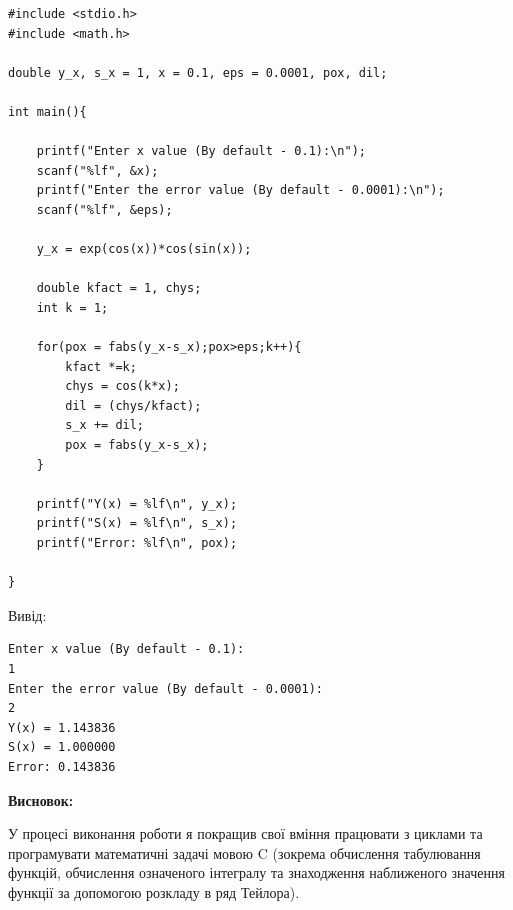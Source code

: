 \documentclass{article}
\begin{document}
\begin{lstlisting}[frame=single]
#include <stdio.h>
#include <math.h>

double y_x, s_x = 1, x = 0.1, eps = 0.0001, pox, dil;

int main(){

	printf("Enter x value (By default - 0.1):\n");
	scanf("%lf", &x);
	printf("Enter the error value (By default - 0.0001):\n");
	scanf("%lf", &eps);

	y_x = exp(cos(x))*cos(sin(x));

	double kfact = 1, chys;
	int k = 1;

	for(pox = fabs(y_x-s_x);pox>eps;k++){
		kfact *=k;
		chys = cos(k*x);
		dil = (chys/kfact);
		s_x += dil;
		pox = fabs(y_x-s_x);
	}

	printf("Y(x) = %lf\n", y_x);
	printf("S(x) = %lf\n", s_x);
	printf("Error: %lf\n", pox);

}
\end{lstlisting}

{\fontsize{14}{16.1}\selectfont
Вивід:}

\begin{lstlisting}
Enter x value (By default - 0.1):
1
Enter the error value (By default - 0.0001):
2
Y(x) = 1.143836
S(x) = 1.000000
Error: 0.143836
\end{lstlisting}

{\fontsize{14}{16.1}\selectfont
\textbf{Висновок:}

У процесі виконання роботи я покращив свої вміння працювати з циклами та програмувати математичні задачі мовою C (зокрема обчислення табулювання функцій, обчислення означеного інтегралу та знаходження наближеного значення функції за допомогою розкладу в ряд Тейлора).

}
\end{document}
